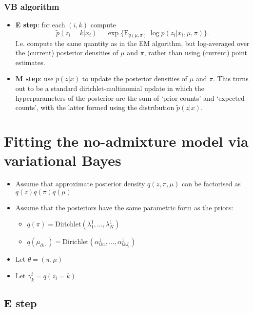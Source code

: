 \documentclass[12pt,a4paper,reqno]{article}
\newcommand{\E}{\text{E}{}}
\newcommand{\(}{\left(}
\newcommand{\)}{\right)}
\newcommand{\|}{\arrowvert}
\begin{document}
\subsubsection{VB algorithm}
\begin{itemize}
\item \textbf{E step}: for each $(i,k)$ compute 
\[
\tilde p(z_{i} = k| x_{i}) = \exp\{\E_{q(\mu,\pi)} ~ \log p(z_{i}|x_{i},\mu,\pi)\}.
\]
I.e. compute the same quantity as in the EM algorithm, but log-averaged over the (current) posterior densities of $\mu$ and $\pi$, rather than using (current) point estimates.
\item \textbf{M step}: use $\tilde p(z|x)$ to update the posterior densities of $\mu$ and $\pi$. This turns out to be a standard dirichlet-multinomial update in which the hyperparameters of the posterior are the sum of `prior counts' and `expected counts', with the latter formed using the distribution $\tilde p(z|x)$.
\end{itemize}

\section{Fitting the no-admixture model via variational Bayes}

\begin{itemize}
\item Assume that approximate posterior density $q(z,\pi,\mu)$ can be factorised as $q(z)q(\pi)q(\mu)$
\item Assume that the posteriors have the same parametric form as the priors:
  \begin{itemize}
  \item $q(\pi) = \text{Dirichlet}(\lambda^{1}_{1},\ldots,\lambda^{1}_{K})$
  \item $q(\mu_{lk\cdot}) = \text{Dirichlet}(\alpha^{1}_{lk1},\ldots,\alpha^{1}_{lkJ_{l}})$
  \end{itemize}
\item Let $\theta = (\pi,\mu)$
\item Let $\gamma^{i}_{k} = q(z_{i}=k)$
\end{itemize}

\subsection{E step}
\end{document}
